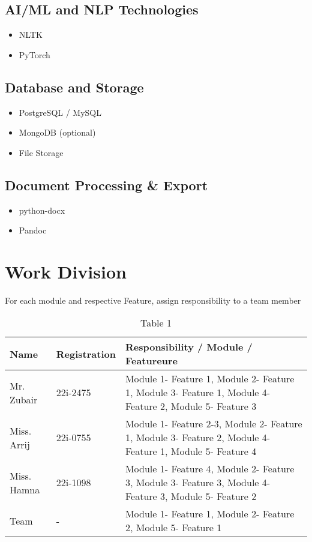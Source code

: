\subsection*{AI/ML and NLP Technologies}
\begin{itemize}
    \item NLTK 
    \item PyTorch 
\end{itemize}

\subsection*{Database and Storage}
\begin{itemize}
    \item PostgreSQL / MySQL 
    \item MongoDB (optional) 
    \item File Storage 
\end{itemize}

\subsection*{Document Processing \& Export}
\begin{itemize}
    \item python-docx 
    \item Pandoc 
\end{itemize}

\section{Work Division}
For each module and respective Feature, assign responsibility to a team member

\begin{table}[!ht]
\caption{Table 1}
\centering
\small
\begin{tabular}{|p{3cm}|p{2cm}|p{9cm}|}
\hline
\textbf{Name} & \textbf{Registration} & \textbf{Responsibility / Module / Featureure} \\ \hline
Mr. Zubair & 22i-2475 & Module 1- Feature 1, Module 2- Feature 1, Module 3- Feature 1, Module 4- Feature 2, Module 5- Feature 3  \\ \hline  
Miss. Arrij & 22i-0755 & Module 1- Feature 2-3, Module 2- Feature 1, Module 3- Feature 2, Module 4- Feature 1, Module 5- Feature 4  \\ \hline  
Miss. Hamna & 22i-1098 & Module 1- Feature 4, Module 2- Feature 3, Module 3- Feature 3, Module 4- Feature 3, Module 5- Feature 2 \\ \hline
Team & - & Module 1- Feature 1, Module 2- Feature 2, Module 5- Feature 1   \\ \hline  
\end{tabular}
\end{table}


